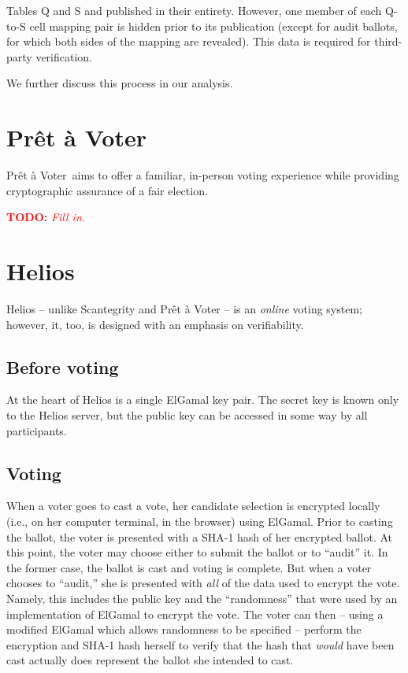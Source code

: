 \documentclass[10pt,twocolumn]{article}
\newcommand{\todo}[1]{\textcolor{red}{\textbf{TODO:} \emph{#1}}}
\newcommand{\preta}{Pr\^{e}t \`{a}}
\newcommand{\pv}{\preta{} Voter}
\begin{document}
Tables Q and S and published in their entirety. However, one member of each Q-to-S cell mapping pair
is hidden prior to its publication (except for audit ballots, for which both sides of the mapping
are revealed). This data is required for third-party verification.

We further discuss this process in our analysis.


\section{\pv{}}

\pv\ aims to offer a familiar, in-person voting experience while providing cryptographic assurance of
a fair election.

\todo{Fill in.}

\section{Helios}

Helios \cite{helios} -- unlike Scantegrity and \pv{} -- is an \emph{online} voting
system; however, it, too, is designed with an emphasis on verifiability.

\subsection{Before voting}

At the heart of Helios is a single ElGamal key pair. The secret key is known only to the Helios
server, but the public key can be accessed in some way by all participants.

\subsection{Voting}

When a voter goes to cast a vote, her candidate selection is encrypted locally (i.e., on her
computer terminal, in the browser) using ElGamal. Prior to casting the ballot, the voter is
presented with a SHA-1 hash of her encrypted ballot. At this point, the voter may choose either
to submit the ballot or to ``audit'' it. In the former case, the ballot is cast and voting is
complete. But when a voter chooses to ``audit,'' she is presented with \emph{all} of the data
used to encrypt the vote. Namely, this includes the public key and the ``randomness'' that were used
by an implementation of ElGamal to encrypt the vote. The voter can then -- using a modified ElGamal
which allows randomness to be specified -- perform the encryption and SHA-1 hash herself
to verify that the hash that \emph{would} have been cast actually does represent the ballot she
intended to cast.
\end{document}
